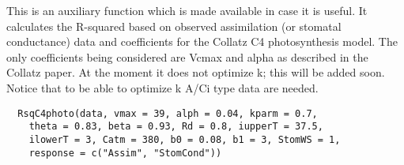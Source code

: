 \documentclass[letterpaper]{book}
\begin{document}
%
\begin{Description}\relax
This is an auxiliary function which is made available in
case it is useful. It calculates the R-squared based on
observed assimilation (or stomatal conductance) data and
coefficients for the Collatz C4 photosynthesis model. The
only coefficients being considered are Vcmax and alpha as
described in the Collatz paper. At the moment it does not
optimize k; this will be added soon.  Notice that to be
able to optimize k A/Ci type data are needed.
\end{Description}
%
\begin{Usage}
\begin{verbatim}
  RsqC4photo(data, vmax = 39, alph = 0.04, kparm = 0.7,
    theta = 0.83, beta = 0.93, Rd = 0.8, iupperT = 37.5,
    ilowerT = 3, Catm = 380, b0 = 0.08, b1 = 3, StomWS = 1,
    response = c("Assim", "StomCond"))
\end{verbatim}
\end{Usage}
%
\end{document}

